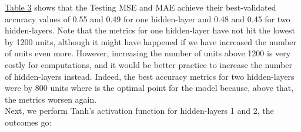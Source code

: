 \hyperref[table:Results for RNN, Sigmoid, High]{Table 3} shows that the Testing MSE and MAE achieve their best-validated accuracy values of 0.55 and 0.49 for one hidden-layer and 0.48 and 0.45 for two hidden-layers. Note that the metrics for one hidden-layer have not hit the lowest by 1200 units, although it might have happened if we have increased the number of units even more. However, increasing the number of units above 1200 is very costly for computations, and it would be better practice to increase the number of hidden-layers instead. Indeed, the best accuracy metrics for two hidden-layers were by 800 units where is the optimal point for the model because, above that, the metrics worsen again.\\

Next, we perform Tanh's activation function for hidden-layers 1 and 2, the outcomes go:

